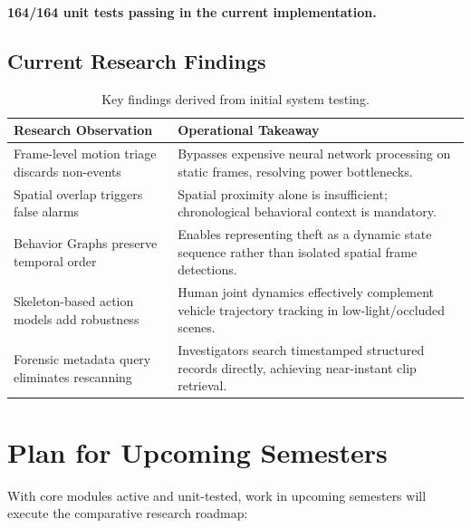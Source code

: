 \documentclass[11pt, a4paper]{article}
\begin{document}
\begin{center}
\textbf{164/164 unit tests passing in the current implementation.}
\end{center}


\subsection{Current Research Findings}
\begin{table}[H]
\centering
\small
\renewcommand{\arraystretch}{1.3}
\begin{tabularx}{\textwidth}{|>{\hsize=0.4\hsize}X|>{\hsize=0.6\hsize}X|}
\hline
\textbf{Research Observation} & \textbf{Operational Takeaway} \\
\hline
Frame-level motion triage discards non-events & Bypasses expensive neural network processing on static frames, resolving power bottlenecks. \\
\hline
Spatial overlap triggers false alarms & Spatial proximity alone is insufficient; chronological behavioral context is mandatory. \\
\hline
Behavior Graphs preserve temporal order & Enables representing theft as a dynamic state sequence rather than isolated spatial frame detections. \\
\hline
Skeleton-based action models add robustness & Human joint dynamics effectively complement vehicle trajectory tracking in low-light/occluded scenes. \\
\hline
Forensic metadata query eliminates rescanning & Investigators search timestamped structured records directly, achieving near-instant clip retrieval. \\
\hline
\end{tabularx}
\caption{Key findings derived from initial system testing.}
\end{table}

\section{Plan for Upcoming Semesters}

With core modules active and unit-tested, work in upcoming semesters will execute the comparative research roadmap:
\end{document}
